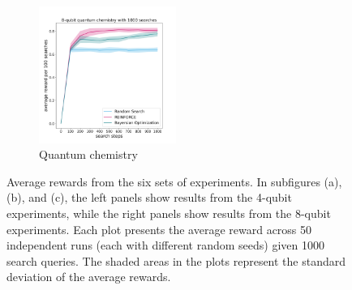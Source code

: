 \documentclass{article} %
\begin{document}
\begin{figure}[ht]
\begin{center}
\begin{subfigure}[b]{0.325\textwidth}
    \includegraphics[width=0.49\textwidth]{images/8-qubits-vqe_avg_reward_per_100_with_var_filling.png}
    \caption{Quantum chemistry} 
    \label{quantum_chemistry}
    \end{subfigure}
    \caption{Average rewards from the six sets of experiments. In subfigures (a), (b), and (c), the left panels show results from the 4-qubit experiments, while the right panels show results from the 8-qubit experiments. Each plot presents the average reward across 50 independent runs (each with different random seeds) given 1000 search queries. The shaded areas in the plots represent the standard deviation of the average rewards.}
    \label{average_reward}
\end{center}
\end{figure}
\end{document}
